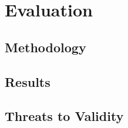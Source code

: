 \chapter{Evaluation}
\label{ch:Evaluation}

\section{Methodology}
\label{sec:Methodology}

\section{Results}
\label{sec:Results}

\section{Threats to Validity}
\label{sec:Threads-to-Validity}

\endinput

Any text after an \endinput is ignored.
You could put scraps here or things in progress.